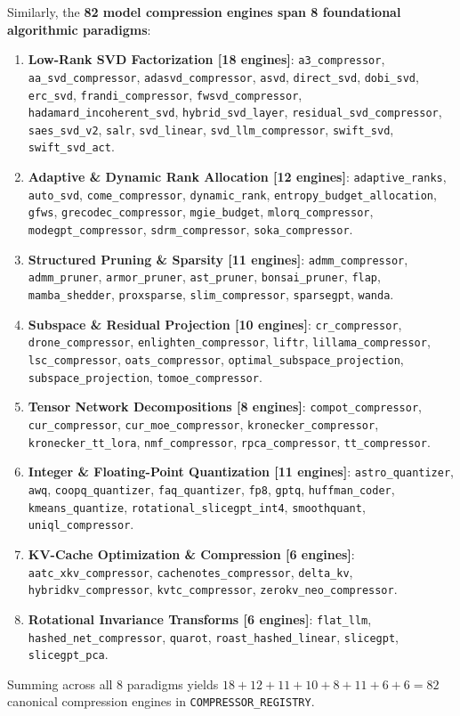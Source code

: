 \documentclass{article}
\begin{document}
Similarly, the \textbf{82 model compression engines span 8 foundational algorithmic paradigms}:
\begin{enumerate}
    \item \textbf{Low-Rank SVD Factorization [18 engines]}: \texttt{a3\_compressor}, \texttt{aa\_svd\_compressor}, \texttt{adasvd\_compressor}, \texttt{asvd}, \texttt{direct\_svd}, \texttt{dobi\_svd}, \texttt{erc\_svd}, \texttt{frandi\_compressor}, \texttt{fwsvd\_compressor}, \texttt{hadamard\_incoherent\_svd}, \texttt{hybrid\_svd\_layer}, \texttt{residual\_svd\_compressor}, \texttt{saes\_svd\_v2}, \texttt{salr}, \texttt{svd\_linear}, \texttt{svd\_llm\_compressor}, \texttt{swift\_svd}, \texttt{swift\_svd\_act}.
    \item \textbf{Adaptive \& Dynamic Rank Allocation [12 engines]}: \texttt{adaptive\_ranks}, \texttt{auto\_svd}, \texttt{come\_compressor}, \texttt{dynamic\_rank}, \texttt{entropy\_budget\_allocation}, \texttt{gfws}, \texttt{grecodec\_compressor}, \texttt{mgie\_budget}, \texttt{mlorq\_compressor}, \texttt{modegpt\_compressor}, \texttt{sdrm\_compressor}, \texttt{soka\_compressor}.
    \item \textbf{Structured Pruning \& Sparsity [11 engines]}: \texttt{admm\_compressor}, \texttt{admm\_pruner}, \texttt{armor\_pruner}, \texttt{ast\_pruner}, \texttt{bonsai\_pruner}, \texttt{flap}, \texttt{mamba\_shedder}, \texttt{proxsparse}, \texttt{slim\_compressor}, \texttt{sparsegpt}, \texttt{wanda}.
    \item \textbf{Subspace \& Residual Projection [10 engines]}: \texttt{cr\_compressor}, \texttt{drone\_compressor}, \texttt{enlighten\_compressor}, \texttt{liftr}, \texttt{lillama\_compressor}, \texttt{lsc\_compressor}, \texttt{oats\_compressor}, \texttt{optimal\_subspace\_projection}, \texttt{subspace\_projection}, \texttt{tomoe\_compressor}.
    \item \textbf{Tensor Network Decompositions [8 engines]}: \texttt{compot\_compressor}, \texttt{cur\_compressor}, \texttt{cur\_moe\_compressor}, \texttt{kronecker\_compressor}, \texttt{kronecker\_tt\_lora}, \texttt{nmf\_compressor}, \texttt{rpca\_compressor}, \texttt{tt\_compressor}.
    \item \textbf{Integer \& Floating-Point Quantization [11 engines]}: \texttt{astro\_quantizer}, \texttt{awq}, \texttt{coopq\_quantizer}, \texttt{faq\_quantizer}, \texttt{fp8}, \texttt{gptq}, \texttt{huffman\_coder}, \texttt{kmeans\_quantize}, \texttt{rotational\_slicegpt\_int4}, \texttt{smoothquant}, \texttt{uniql\_compressor}.
    \item \textbf{KV-Cache Optimization \& Compression [6 engines]}: \texttt{aatc\_xkv\_compressor}, \texttt{cachenotes\_compressor}, \texttt{delta\_kv}, \texttt{hybridkv\_compressor}, \texttt{kvtc\_compressor}, \texttt{zerokv\_neo\_compressor}.
    \item \textbf{Rotational Invariance Transforms [6 engines]}: \texttt{flat\_llm}, \texttt{hashed\_net\_compressor}, \texttt{quarot}, \texttt{roast\_hashed\_linear}, \texttt{slicegpt}, \texttt{slicegpt\_pca}.
\end{enumerate}
Summing across all 8 paradigms yields $18 + 12 + 11 + 10 + 8 + 11 + 6 + 6 = 82$ canonical compression engines in \texttt{COMPRESSOR\_REGISTRY}.
\end{document}
